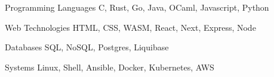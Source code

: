 


\begin{cvskills}

  \cvskill
    {Programming Languages} %
    {C, Rust, Go, Java, OCaml, Javascript, Python} %

  \cvskill
    {Web Technologies} %
    {HTML, CSS, WASM, React, Next, Express, Node} %

  \cvskill
    {Databases} %
    {SQL, NoSQL, Postgres, Liquibase} %

  \cvskill
    {Systems} %
    {Linux, Shell, Ansible, Docker, Kubernetes, AWS} %

\end{cvskills}
